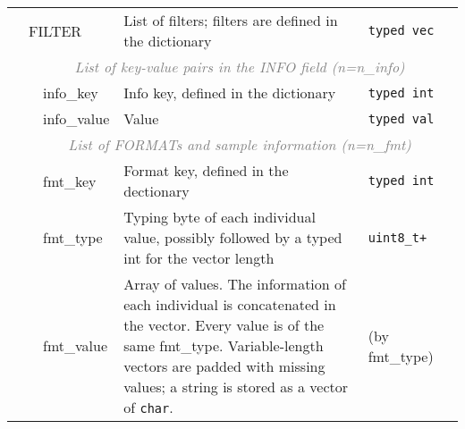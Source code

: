 \documentclass[10pt]{article}
\begin{document}
\begin{table}[ht]
{\begin{tabular}{|l|l|l|p{8.2cm}|l|r|}
  & \multicolumn{2}{l|}{\sf FILTER} & List of filters; filters are defined in the dictionary & {\tt typed vec} & \\\cline{2-6}
  & \multicolumn{5}{c|}{\textcolor{gray}{\it List of key-value pairs in the INFO field (n=n\_info)}} \\\cline{3-6}
  & & {\sf info\_key} & Info key, defined in the dictionary & {\tt typed int} & \\\cline{3-6}
  & & {\sf info\_value} & Value & {\tt typed val} &\\\cline{2-6}
  & \multicolumn{5}{c|}{\textcolor{gray}{\it List of FORMATs and sample information (n=n\_fmt)}} \\\cline{3-6}
  & & {\sf fmt\_key} & Format key, defined in the dectionary & {\tt typed int} & \\\cline{3-6}
  & & {\sf fmt\_type} & Typing byte of each individual value, possibly followed by a typed int for the vector length & {\tt uint8\_t+} & \\\cline{3-6}
  & & {\sf fmt\_value} & Array of values. The information of each individual is concatenated in the vector. Every value is of the same {\sf fmt\_type}.
  	Variable-length vectors are padded with missing values; a string is stored as a vector of {\tt char}. & (by {\sf fmt\_type}) &\\
  \cline{1-6}
\end{tabular}}
\end{table}
\end{document}

